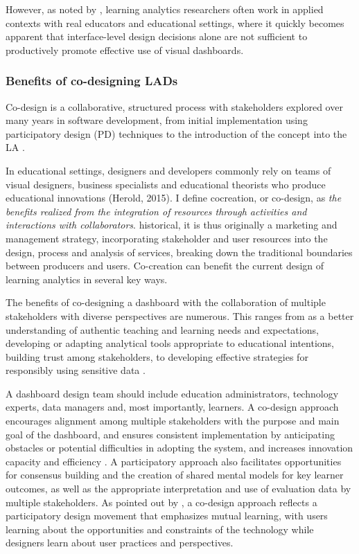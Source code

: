 \documentclass[preprint,12pt]{elsarticle}
\begin{document}
However, as noted by \citet{dollinger2018co}, learning analytics researchers often work in applied contexts with real educators and educational settings, where it quickly becomes apparent that interface-level design decisions alone are not sufficient to productively promote effective use of visual dashboards. 


\subsubsection{Benefits of co-designing LADs}
Co-design is a collaborative, structured process with stakeholders explored over many years in software development, from initial implementation using participatory design (PD) techniques to the introduction of the concept into the LA \cite{prieto2020engaging}.

In educational settings, designers and developers commonly rely on teams of visual designers, business specialists and educational theorists who produce educational innovations (Herold, 2015). I
\citet*{mccoll2012health} define cocreation, or co-design, as \textit{the benefits realized from the integration of resources through activities and interactions with collaborators}. historical, it is thus originally a marketing and management strategy, incorporating stakeholder and user resources into the design, process and analysis of services, breaking down the traditional boundaries between producers and users. Co-creation can benefit the current design of learning
analytics in several key ways.


The benefits of co-designing a dashboard with the collaboration of multiple stakeholders with diverse perspectives are numerous. 
This ranges from as a better understanding of authentic teaching and learning needs and expectations, developing or adapting analytical tools appropriate to educational intentions, building trust among stakeholders, to developing effective strategies for responsibly using sensitive data \cite{beattie2014creepy}.

A dashboard design team should include education administrators, technology experts, data managers and, most importantly, learners. A co-design approach encourages alignment among multiple stakeholders with the purpose and main goal of the dashboard, and ensures consistent implementation by anticipating obstacles or potential difficulties in adopting the system, and increases innovation capacity and efficiency \citet{boscardin2018twelve}. A participatory approach also facilitates opportunities for consensus building and the creation of shared mental models for key learner outcomes, as well as the appropriate interpretation and use of evaluation data by multiple stakeholders. As pointed out by \citet{schuler1993participatory}, a co-design approach reflects a participatory design movement that emphasizes mutual learning, with users learning about the opportunities and constraints of the technology while designers learn about user practices and perspectives.
\end{document}
